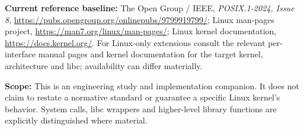 \documentclass[11pt,letterpaper,oneside]{report}
\begin{document}
\textbf{Current reference baseline:} The Open Group / IEEE, \emph{POSIX.1-2024, Issue 8}, \url{https://pubs.opengroup.org/onlinepubs/9799919799/}; Linux man-pages project, \url{https://man7.org/linux/man-pages/}; Linux kernel documentation, \url{https://docs.kernel.org/}. For Linux-only extensions consult the relevant per-interface manual pages and kernel documentation for the target kernel, architecture and libc; availability can differ materially.

\textbf{Scope:} This is an engineering study and implementation companion. It does not claim to restate a normative standard or guarantee a specific Linux kernel's behavior. System calls, libc wrappers and higher-level library functions are explicitly distinguished where material.
\end{document}
